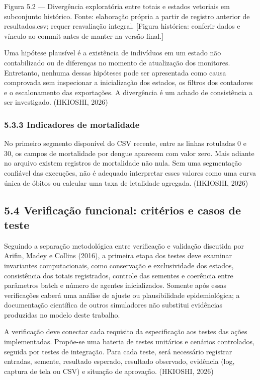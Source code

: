 Figura 5.2 --- Divergência exploratória entre totais e estados vetoriais
em subconjunto histórico. Fonte: elaboração própria a partir de registro
anterior de resultados.csv; requer reavaliação integral. {[}Figura
histórica: conferir dados e vínculo ao commit antes de manter na versão
final.{]}

Uma hipótese plausível é a existência de indivíduos em um estado não
contabilizado ou de diferenças no momento de atualização dos monitores.
Entretanto, nenhuma dessas hipóteses pode ser apresentada como causa
comprovada sem inspecionar a inicialização dos estados, os filtros dos
contadores e o escalonamento das exportações. A divergência é um achado
de consistência a ser investigado. (HKIOSHI, 2026)

\subsubsection{5.3.3 Indicadores de
mortalidade}\label{indicadores-de-mortalidade}

No primeiro segmento disponível do CSV recente, entre as linhas
rotuladas 0 e 30, os campos de mortalidade por dengue aparecem com valor
zero. Mais adiante no arquivo existem registros de mortalidade não nula.
Sem uma segmentação confiável das execuções, não é adequado interpretar
esses valores como uma curva única de óbitos ou calcular uma taxa de
letalidade agregada. (HKIOSHI, 2026)

\subsection{5.4 Verificação funcional: critérios e casos de
teste}\label{verificauxe7uxe3o-funcional-crituxe9rios-e-casos-de-teste}

Seguindo a separação metodológica entre verificação e validação
discutida por Arifin, Madey e Collins (2016), a primeira etapa dos
testes deve examinar invariantes computacionais, como conservação e
exclusividade dos estados, consistência dos totais registrados, controle
das sementes e coerência entre parâmetros batch e número de agentes
inicializados. Somente após essas verificações caberá uma análise de
ajuste ou plausibilidade epidemiológica; a documentação científica de
outros simuladores não substitui evidências produzidas no modelo deste
trabalho.

A verificação deve conectar cada requisito da especificação aos testes
das ações implementadas. Propõe-se uma bateria de testes unitários e
cenários controlados, seguida por testes de integração. Para cada teste,
será necessário registrar entradas, semente, resultado esperado,
resultado observado, evidência (log, captura de tela ou CSV) e situação
de aprovação. (HKIOSHI, 2026)

